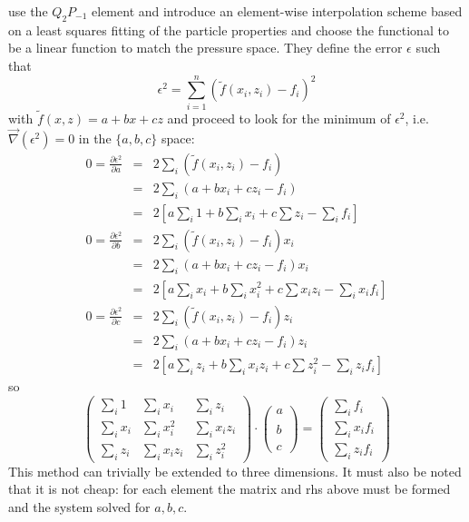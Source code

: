 \documentclass[a4paper,12pt]{article}
\newcommand{\nn}{\nonumber}
\begin{document}
\textcite{thmk14} use the $Q_2P_{-1}$ element and introduce an 
element-wise interpolation
scheme based on a least squares fitting of the particle properties and choose the functional to 
be a linear function to match the pressure space. 
They define the error $\epsilon$ such that 
\[
\epsilon^2 = \sum_{i=1}^n ( \tilde{f}(x_i,z_i)-f_i)^2
\]
with $\tilde{f}(x,z)=a+bx+cz$ and proceed to  
look for the minimum of $\epsilon^2$, i.e. $\vec\nabla(\epsilon^2)=0$ in the $\{a,b,c\}$ space:
\begin{eqnarray}
0=\frac{\partial \epsilon^2}{\partial a} 
&=& 2\sum\limits_i ( \tilde{f}(x_i,z_i)-f_i) \nn\\
&=& 2\sum\limits_i ( a + bx_i +cz_i -f_i) \nn\\
&=& 2 \left[ a \sum\limits_i 1 + b \sum\limits_i x_i + c \sum z_i - \sum\limits_i f_i \right] \nn\\
0=\frac{\partial \epsilon^2}{\partial b} &=& 2\sum\limits_i ( \tilde{f}(x_i,z_i)-f_i) x_i \nn\\
&=& 2\sum\limits_i ( a + bx_i +cz_i -f_i) x_i \nn\\
&=& 2 \left[ a \sum\limits_i x_i  + b \sum\limits_i x_i^2 + c \sum x_i z_i - \sum\limits_i x_i f_i \right]\nn\\
0=\frac{\partial \epsilon^2}{\partial c} &=& 2\sum\limits_i ( \tilde{f}(x_i,z_i)-f_i) z_i \nn\\ 
&=& 2\sum\limits_i ( a + bx_i +cz_i -f_i) z_i \nn\\
&=& 2 \left[ a \sum\limits_i z_i + b \sum\limits_i x_i z_i + c \sum z_i^2 - \sum\limits_i z_if_i \right] \nn
\end{eqnarray}
so 
\[
\left( 
\begin{array}{ccc}
\sum\limits_i 1 & \sum\limits_i x_i & \sum\limits_i z_i \\
\sum\limits_i x_i & \sum\limits_i x_i^2 & \sum\limits_i x_iz_i \\
\sum\limits_i z_i & \sum\limits_i x_i z_i & \sum\limits_i z_i^2 
\end{array}
\right)
\cdot
\left(
\begin{array}{c}
a\\ \\
b\\ \\
c
\end{array}
\right)
=
\left(
\begin{array}{c}
\sum\limits_i f_i \\
\sum\limits_i x_i f_i \\
\sum\limits_i z_i f_i 
\end{array}
\right)
\]
This method can trivially be extended to three dimensions. It must also be noted that 
it is not cheap: for each element the matrix and rhs above must be formed and the system 
solved for $a,b,c$. 
\end{document}
